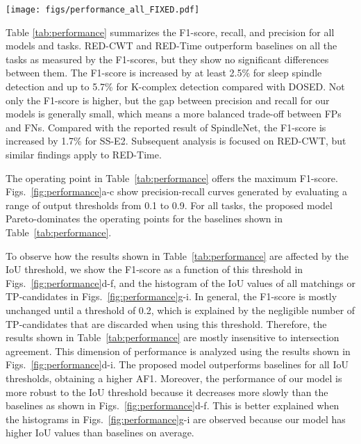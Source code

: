 \documentclass[conference]{IEEEtran}
\begin{document}
\begin{figure*}
\centering \texttt{[image: figs/performance\_all\_FIXED.pdf]}
\caption{
RED-CWT outperforms baselines in the tasks of sleep spindle detection according to expert E1 (first column), sleep spindle detection according to expert E2 (second column), and K-complex detection (third column). (\textbf{a})-(\textbf{c}) Recall and precision when . In addition, a curve was obtained for our model by varying its output threshold . (\textbf{d})-(\textbf{f}) F1-score as a function of the IoU threshold. (\textbf{g})-(\textbf{i}) Histograms of the IoU of matchings (TP-candidates).}
\label{fig:performance}
\end{figure*}


Table \ref{tab:performance} summarizes the F1-score, recall, and precision for all models and tasks. RED-CWT and RED-Time outperform baselines on all the tasks as measured by the F1-scores, but they show no significant differences between them. The F1-score is increased by at least 2.5\% for sleep spindle detection and up to 5.7\% for K-complex detection compared with DOSED. Not only the F1-score is higher, but the gap between precision and recall for our models is generally small, which means a more balanced trade-off between FPs and FNs. Compared with the reported result of SpindleNet, the F1-score is increased by 1.7\% for SS-E2. Subsequent analysis is focused on RED-CWT, but similar findings apply to RED-Time.

The operating point in Table~\ref{tab:performance} offers the maximum F1-score. Figs.~\ref{fig:performance}a-c show precision-recall curves generated by evaluating a range of output thresholds  from 0.1 to 0.9. For all tasks, the proposed model Pareto-dominates the operating points for the baselines shown in Table~\ref{tab:performance}.

To observe how the results shown in Table~\ref{tab:performance} are affected by the IoU threshold, we show the F1-score as a function of this threshold in Figs.~\ref{fig:performance}d-f, and the histogram of the IoU values of all matchings or TP-candidates in Figs.~\ref{fig:performance}g-i. In general, the F1-score is mostly unchanged until a threshold of 0.2, which is explained by the negligible number of TP-candidates that are discarded when using this threshold. Therefore, the results shown in Table~\ref{tab:performance} are mostly insensitive to intersection agreement. This dimension of performance is analyzed using the results shown in Figs.~\ref{fig:performance}d-i. The proposed model outperforms baselines for all IoU thresholds, obtaining a higher AF1. Moreover, the performance of our model is more robust to the IoU threshold because it decreases more slowly than the baselines as shown in Figs.~\ref{fig:performance}d-f. This is better explained when the histograms in Figs.~\ref{fig:performance}g-i are observed because our model has higher IoU values than baselines on average. 
\end{document}
